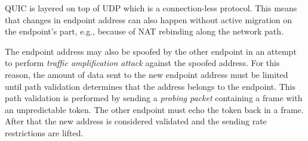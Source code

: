 QUIC is layered on top of UDP which is a connection-less protocol. This means that changes in
endpoint address can also happen without active migration on the endpoint's part, e.g., because of
NAT rebinding along the network path.

The endpoint address may also be spoofed by the other endpoint in an attempt to perform
\textit{traffic amplification attack} against the spoofed address. For this reason, the amount of
data sent to the new endpoint address must be limited until path validation determines that the
address belongs to the endpoint. This path validation is performed by sending a \textit{probing
  packet} containing a \PATHCHALLENGE{} frame with an unpredictable token. The other endpoint must
echo the token back in a \PATHRESPONSE{} frame. After that the new address is considered validated
and the sending rate restrictions are lifted.
